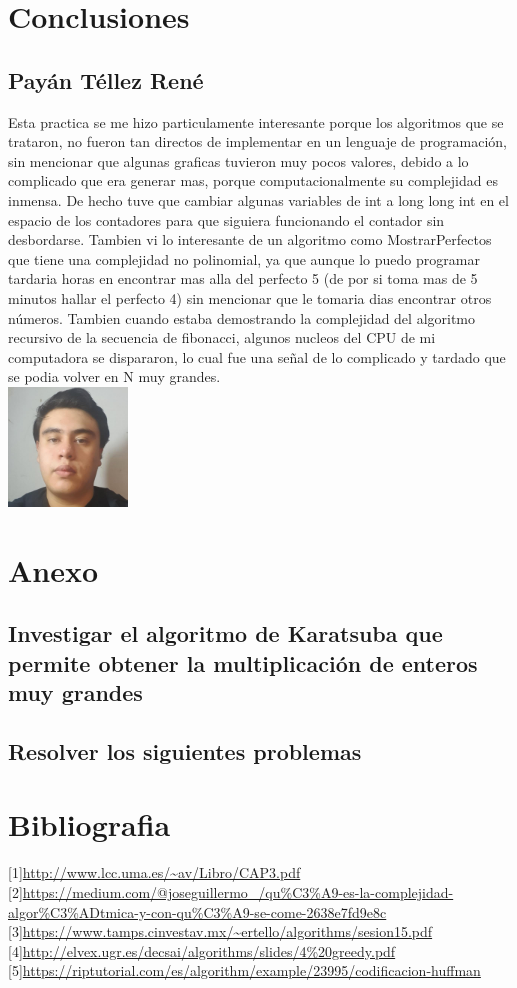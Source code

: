 \documentclass[spanish]{article}
\begin{document}
	\section{Conclusiones}			
	\subsection{Payán Téllez René}
	Esta practica se me hizo particulamente interesante porque los algoritmos que se trataron, no fueron tan directos de implementar en un lenguaje de programación, sin mencionar que algunas graficas tuvieron muy pocos valores, debido a lo complicado que era generar mas, porque computacionalmente su complejidad es inmensa. De hecho tuve que cambiar algunas variables de int a long long int en el espacio de los contadores para que siguiera funcionando el contador sin desbordarse. Tambien vi lo interesante de un algoritmo como MostrarPerfectos que tiene una complejidad no polinomial, ya que aunque lo puedo programar tardaria horas en encontrar mas alla del perfecto 5 (de por si toma mas de 5 minutos hallar el perfecto 4) sin mencionar que le tomaria dias encontrar otros números. Tambien cuando estaba demostrando la complejidad del algoritmo recursivo de la secuencia de fibonacci, algunos nucleos del CPU de mi computadora se dispararon, lo cual fue una señal de lo complicado y tardado que se podia volver en N muy grandes.\\
	\includegraphics[height=120px,width=120px]{Rene}
	\section{Anexo}			
	\subsection{Investigar el algoritmo de Karatsuba que permite obtener la multiplicación de enteros muy grandes}
	\subsection{Resolver los siguientes problemas}
	\section{Bibliografia}
		{[}1{]}\url{http://www.lcc.uma.es/~av/Libro/CAP3.pdf}\\
		{[}2{]}\url{https://medium.com/@joseguillermo_/qu\%C3\%A9-es-la-complejidad-algor\%C3\%ADtmica-y-con-qu\%C3\%A9-se-come-2638e7fd9e8c}\\
		{[}3{]}\url{https://www.tamps.cinvestav.mx/~ertello/algorithms/sesion15.pdf	}\\		
		{[}4{]}\url{http://elvex.ugr.es/decsai/algorithms/slides/4\%20greedy.pdf}\\		
		{[}5{]}\url{https://riptutorial.com/es/algorithm/example/23995/codificacion-huffman}\\		
	
\end{document}
